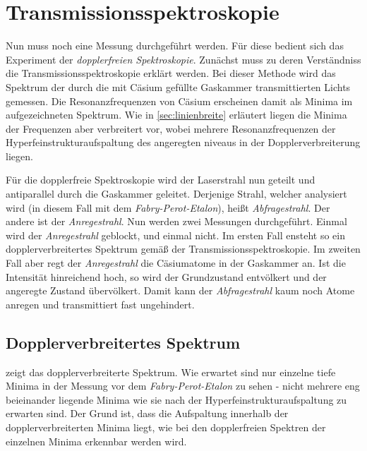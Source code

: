 \documentclass[../bericht.tex]{subfiles}
\begin{document}
      \section{Transmissionsspektroskopie}
      \label{sec:transmissionsspektroskopie}

        Nun muss noch eine Messung durchgeführt werden. Für diese bedient sich das Experiment der \textit{dopplerfreien Spektroskopie}. Zun\"achst muss zu deren Verständniss die Transmissionsspektroskopie erklärt werden. Bei dieser Methode wird das Spektrum der durch die mit C\"asium gefüllte Gaskammer transmittierten Lichts gemessen. Die Resonanzfrequenzen von Cäsium erscheinen damit als Minima im aufgezeichneten Spektrum. Wie in \cref{sec:linienbreite} erläutert liegen die Minima der Frequenzen aber verbreitert vor, wobei mehrere Resonanzfrequenzen der Hyperfeinstrukturaufspaltung des angeregten niveaus in der Dopplerverbreiterung liegen.
        \medskip

        Für die dopplerfreie Spektroskopie wird der Laserstrahl nun geteilt und antiparallel durch die Gaskammer geleitet. Derjenige Strahl, welcher analysiert wird (in diesem Fall mit dem \textit{Fabry-Perot-Etalon}), heißt \textit{Abfragestrahl}. Der andere ist der \textit{Anregestrahl}. Nun werden zwei Messungen durchgeführt. Einmal wird der \textit{Anregestrahl} geblockt, und einmal nicht. Im ersten Fall ensteht so ein dopplerverbreitertes Spektrum gemäß der Transmissionsspektroskopie. Im zweiten Fall aber regt der \textit{Anregestrahl} die Cäsiumatome in der Gaskammer an. Ist die Intensität hinreichend hoch, so wird der Grundzustand entvölkert und der angeregte Zustand übervölkert. Damit kann der \textit{Abfragestrahl} kaum noch Atome anregen und transmittiert fast ungehindert.


      \subsection{Dopplerverbreitertes Spektrum}

         zeigt das dopplerverbreiterte Spektrum. Wie erwartet sind nur einzelne tiefe Minima in der Messung vor dem \textit{Fabry-Perot-Etalon} zu sehen - nicht mehrere eng beieinander liegende Minima wie sie nach der Hyperfeinstrukturaufspaltung zu erwarten sind. Der Grund ist, dass die Aufspaltung innerhalb der dopplerverbreiterten Minima liegt, wie bei den dopplerfreien Spektren der einzelnen Minima erkennbar werden wird.
\end{document}
